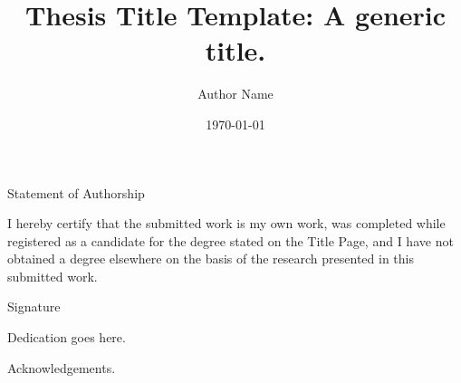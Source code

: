 \documentclass[british,12pt]{phdthesis}
\title{Thesis Title Template: A generic title.}
\author{Author Name}
\date{\today}
\begin{document}
\maketitle





\begin{dedication}
Statement of Authorship

I hereby certify that the submitted work is my own work, was completed while registered as a candidate for the degree stated on the Title Page, and I have not obtained a degree elsewhere on the basis of the research presented in this submitted work.

\vspace{5 cm}

Signature\hspace{0.5cm} \makebox[2in]{\hrulefill}
\end{dedication}

\begin{dedication}
Dedication goes here.
\end{dedication}

\begin{acknowledgements}

Acknowledgements.

\end{acknowledgements}

\newpage



\onehalfspacing

\end{document}
